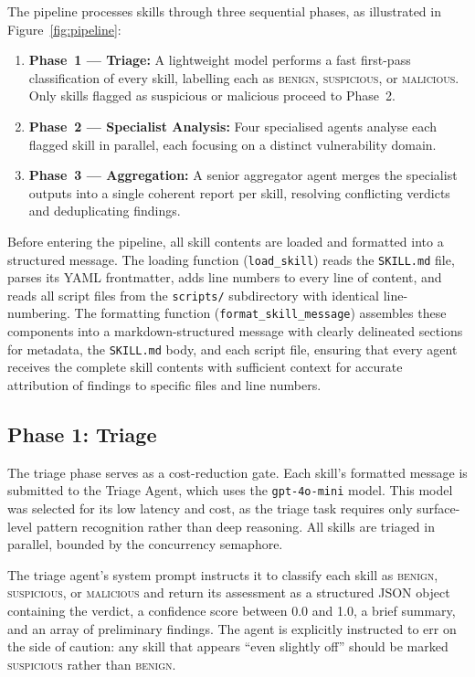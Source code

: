 The pipeline processes skills through three sequential phases, as illustrated in Figure~\ref{fig:pipeline}:

\begin{enumerate}
    \item \textbf{Phase~1 --- Triage:} A lightweight model performs a fast first-pass classification of every skill, labelling each as \textsc{benign}, \textsc{suspicious}, or \textsc{malicious}. Only skills flagged as suspicious or malicious proceed to Phase~2.
    \item \textbf{Phase~2 --- Specialist Analysis:} Four specialised agents analyse each flagged skill in parallel, each focusing on a distinct vulnerability domain.
    \item \textbf{Phase~3 --- Aggregation:} A senior aggregator agent merges the specialist outputs into a single coherent report per skill, resolving conflicting verdicts and deduplicating findings.
\end{enumerate}

Before entering the pipeline, all skill contents are loaded and formatted into a structured message. The loading function (\texttt{load\_skill}) reads the \texttt{SKILL.md} file, parses its YAML frontmatter, adds line numbers to every line of content, and reads all script files from the \texttt{scripts/} subdirectory with identical line-numbering. The formatting function (\texttt{format\_skill\_message}) assembles these components into a markdown-structured message with clearly delineated sections for metadata, the \texttt{SKILL.md} body, and each script file, ensuring that every agent receives the complete skill contents with sufficient context for accurate attribution of findings to specific files and line numbers.

\subsection{Phase 1: Triage}
\label{sec:triage}

The triage phase serves as a cost-reduction gate. Each skill's formatted message is submitted to the Triage Agent, which uses the \texttt{gpt-4o-mini} model. This model was selected for its low latency and cost, as the triage task requires only surface-level pattern recognition rather than deep reasoning. All skills are triaged in parallel, bounded by the concurrency semaphore.

The triage agent's system prompt instructs it to classify each skill as \textsc{benign}, \textsc{suspicious}, or \textsc{malicious} and return its assessment as a structured JSON object containing the verdict, a confidence score between 0.0 and 1.0, a brief summary, and an array of preliminary findings. The agent is explicitly instructed to err on the side of caution: any skill that appears ``even slightly off'' should be marked \textsc{suspicious} rather than \textsc{benign}.

